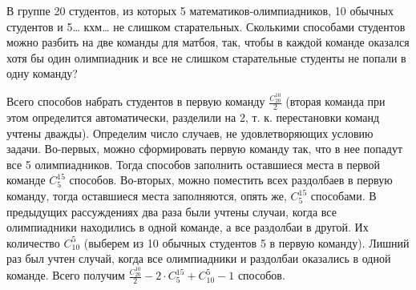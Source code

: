 \begin{task}{85}
В группе 20 студентов, из которых 5 математиков-олимпиадников, 10 обычных студентов и 5… кхм… не слишком старательных. Сколькими способами студентов можно разбить на две команды для матбоя, так, чтобы в каждой команде оказался хотя бы один олимпиадник и все не слишком старательные студенты не попали в одну команду?
\end{task}

\begin{solution}
Всего способов набрать студентов в первую команду $\frac{C^{10}_{20}}2$ (вторая команда при этом определится автоматически, разделили на 2, т. к. перестановки команд учтены дважды). Определим число случаев, не удовлетворяющих условию задачи. Во-первых, можно сформировать первую команду так, что в нее попадут все 5 олимпиадников. Тогда способов заполнить оставшиеся места в первой команде $C^{15}_5$ способов. Во-вторых, можно поместить всех раздолбаев в первую команду, тогда оставшиеся места заполняются, опять же, $C^{15}_5$ способами. В предыдущих рассуждениях два раза были учтены случаи, когда все олимпиадники находились в одной команде, а все раздолбаи в другой. Их количество $C^5_{10}$ (выберем из 10 обычных студентов 5 в первую команду). Лишний раз был учтен случай, когда все олимпиадники и раздолбаи оказались в одной команде. Всего получим $\frac{C^{10}_{20}}2 - 2 \cdot C^{15}_5 + C^5_{10} - 1$ способов.
\end{solution}